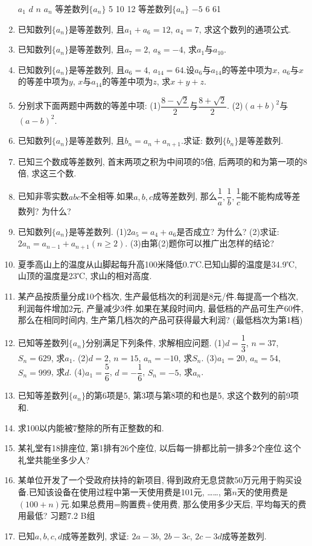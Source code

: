 \documentclass[10pt,a4paper]{article}
\begin{document}
\begin{enumerate}[1.]
    $a_1$	$d$	$n$	$a_n$
等差数列$\{a_n\}$	5	10	12	
等差数列$\{a_n\}$	$-5$	6		61
\item 已知数列$\{a_n\}$是等差数列, 且$a_1+a_6=12$, $a_4=7$, 求这个数列的通项公式.
\item 已知数列$\{a_n\}$是等差数列, 且$a_7=2$, $a_8=-4$, 求$a_1$与$a_{10}$.
\item 已知数列$\{a_n\}$是等差数列, 且$a_6=4$, $a_{14}=64$.设$a_6$与$a_{14}$的等差中项为$x$, $a_6$与$x$的等差中项为$y$, $x$与$a_{14}$的等差中项为$z$, 求$x+y+z$.
\item 分别求下面两题中两数的等差中项:
(1)$\dfrac{8-\sqrt 2}2$与$\dfrac{8+\sqrt 2}2$.
(2)$(a+b)^2$与$(a-b)^2$.
\item 已知数列$\{a_n\}$是等差数列, 且$b_n=a_n+a_{n+1}$.求证: 数列$\{b_n\}$是等差数列.
\item 已知三个数成等差数列, 首末两项之积为中间项的5倍, 后两项的和为第一项的8倍, 求这三个数.
\item 已知非零实数$abc$不全相等.如果$a,b,c$成等差数列, 那么$\dfrac 1a,\dfrac 1b,\dfrac 1c$能不能构成等差数列? 为什么?
\item 已知数列$\{a_n\}$是等差数列.
(1)$2a_5=a_4+a_6$是否成立? 为什么?
(2)求证: $2a_n=a_{n-1}+a_{n+1}(n\ge 2)$.
(3)由第(2)题你可以推广出怎样的结论?
\item 夏季高山上的温度从山脚起每升高100米降低0.7℃.已知山脚的温度是34.9℃, 山顶的温度是23℃, 求山的相对高度.
\item 某产品按质量分成10个档次, 生产最低档次的利润是8元/件.每提高一个档次, 利润每件增加2元, 产量减少3件.如果在某段时间内, 最低档的产品可生产60件, 那么在相同时间内, 生产第几档次的产品可获得最大利润? (最低档次为第1档)
\item 已知等差数列$\{a_n\}$分别满足下列条件, 求解相应问题.
(1)$d=\dfrac 13$, $n=37$, $S_n=629$, 求$a_1$.
(2)$d=2$, $n=15$, $a_n=-10$, 求$S_n$.
(3)$a_1=20$, $a_n=54$, $S_n=999$, 求$d$.
(4)$a_1=\dfrac 56$, $d=-\dfrac 16$, $S_n=-5$, 求$a_n$.
\item 已知等差数列$\{a_n\}$的第6项是5, 第3项与第8项的和也是5, 求这个数列的前9项和.
\item 求100以内能被7整除的所有正整数的和.
\item 某礼堂有18排座位, 第1排有26个座位, 以后每一排都比前一排多2个座位.这个礼堂共能坐多少人?
\item 某单位开发了一个受政府扶持的新项目, 得到政府无息贷款50万元用于购买设备.已知该设备在使用过程中第一天使用费是101元, ……, 第$n$天的使用费是$(100+n)$元.如果总费用=购置费+使用费, 那么使用多少天后, 平均每天的费用最低?
习题7.2  B组
\item 已知$a,b,c,d$成等差数列, 求证: $2a-3b$, $2b-3c$, $2c-3d$成等差数列.

\end{enumerate}
\end{document}
